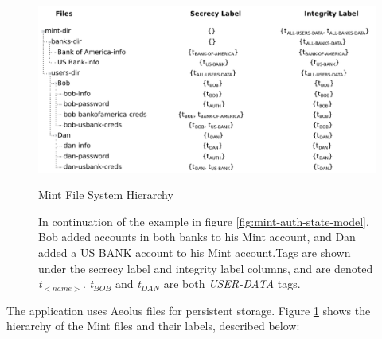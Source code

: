 \begin{figure}[h]
\centering
\includegraphics[width=\textwidth,height=\textheight,keepaspectratio]{figures/mint-filesystem}
\caption*{Mint File System Hierarchy}
\caption[Mint File System Hierarchy]{In continuation of the example in figure \ref{fig:mint-auth-state-model}, Bob added accounts in both banks to his Mint account, and Dan added a US BANK account to his Mint account.Tags are shown under the secrecy label and integrity label columns, and are denoted \emph{t$_{<name>}$}. \emph{t$_{BOB}$} and \emph{t$_{DAN}$} are both \emph{USER-DATA} tags.}
\label{fig:mint-fs}
\end{figure}

The application uses Aeolus files for persistent storage. Figure \ref{fig:mint-fs} shows the hierarchy of the Mint files and their labels, described below:

